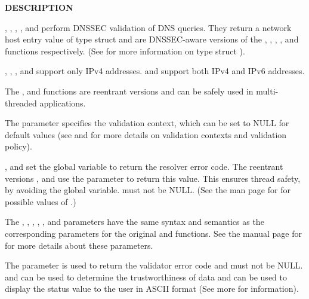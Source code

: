 {\bf DESCRIPTION}

, ,
, ,
 and 
perform DNSSEC validation of DNS queries.  They return a network host entry
value of type struct  and are DNSSEC-aware versions of the
, , ,
,  and
 functions respectively.  (See
 for more information on type struct ).

, ,
, and  support only
IPv4 addresses.
 and  support both
IPv4 and IPv6 addresses.

The ,  and
 functions are reentrant versions and can be
safely used in multi-threaded applications.

The  parameter specifies the validation context, which can be set to
NULL for default values (see  and  for more
details on validation contexts and validation policy).

,  and
 set the global  variable to return
the resolver error code.  The reentrant versions
,  and
 use the  parameter to return
this value.  This ensures thread safety, by avoiding the global 
variable.   must not be NULL.  (See the man page for
 for possible values of .)

The , , , , , and 
parameters have the same syntax and semantics as the corresponding parameters
for the original  and 
functions.  See the manual page for  for more details
about these parameters.

The  parameter is used to return the validator error code and
must not be NULL.   and  can
be used to determine the trustworthiness of data and 
can be used to display the status value to the user in ASCII format (See
 more for information).

